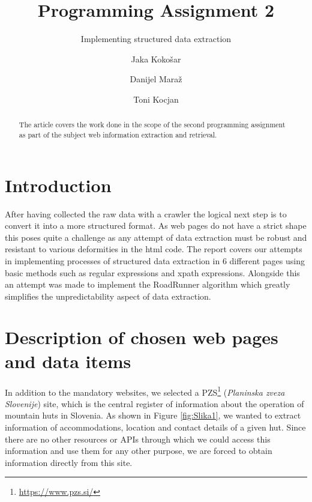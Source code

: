 \documentclass[runningheads]{llncs}
\begin{document}
\title{Programming Assignment 2}
\subtitle{Implementing structured data extraction}

\author{
  Jaka Kokošar
  \and
  Danijel Maraž
  \and
  Toni Kocjan
}


\maketitle             

\begin{abstract}
The article covers the work done in the scope of the second programming assignment as part of the subject web information extraction and retrieval. 

\end{abstract}

\section{Introduction}
After having collected the raw data with a crawler the logical next step is to convert it into a more structured format. As web pages do not have a strict shape this poses quite a challenge as any attempt of data extraction must be robust and resistant to various deformities in the html code. The report covers our attempts in implementing processes of structured data extraction in 6 different pages using basic methods such as regular expressions and xpath expressions. Alongside this an attempt was made to implement the RoadRunner algorithm which greatly simplifies the unpredictability aspect of data extraction.
\section{Description of chosen web pages and data items}
In addition to the mandatory websites, we selected a PZS\footnote{\url{https://www.pzs.si/}} ({\em Planinska zveza Slovenije}) site, which is the central register of information about the operation of mountain huts in Slovenia. As shown in Figure \ref{fig:Slika1}, we wanted to extract information of accommodations, location and contact details of a given hut. Since there are no other resources or APIs through which we could access this information and use them for any other purpose, we are forced to obtain information directly from this site.
\end{document}
